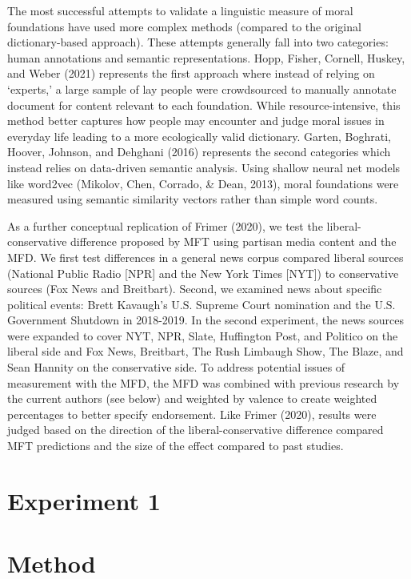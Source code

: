 \documentclass[
  english,
  man,floatsintext]{apa6}
\begin{document}
The most successful attempts to validate a linguistic measure of moral foundations have used more complex methods (compared to the original dictionary-based approach). These attempts generally fall into two categories: human annotations and semantic representations. Hopp, Fisher, Cornell, Huskey, and Weber (2021) represents the first approach where instead of relying on `experts,' a large sample of lay people were crowdsourced to manually annotate document for content relevant to each foundation. While resource-intensive, this method better captures how people may encounter and judge moral issues in everyday life leading to a more ecologically valid dictionary. Garten, Boghrati, Hoover, Johnson, and Dehghani (2016) represents the second categories which instead relies on data-driven semantic analysis. Using shallow neural net models like word2vec (Mikolov, Chen, Corrado, \& Dean, 2013), moral foundations were measured using semantic similarity vectors rather than simple word counts.

As a further conceptual replication of Frimer (2020), we test the liberal-conservative difference proposed by MFT using partisan media content and the MFD. We first test differences in a general news corpus compared liberal sources (National Public Radio {[}NPR{]} and the New York Times {[}NYT{]}) to conservative sources (Fox News and Breitbart). Second, we examined news about specific political events: Brett Kavaugh's U.S. Supreme Court nomination and the U.S. Government Shutdown in 2018-2019. In the second experiment, the news sources were expanded to cover NYT, NPR, Slate, Huffington Post, and Politico on the liberal side and Fox News, Breitbart, The Rush Limbaugh Show, The Blaze, and Sean Hannity on the conservative side. To address potential issues of measurement with the MFD, the MFD was combined with previous research by the current authors (see below) and weighted by valence to create weighted percentages to better specify endorsement. Like Frimer (2020), results were judged based on the direction of the liberal-conservative difference compared MFT predictions and the size of the effect compared to past studies.

\hypertarget{experiment-1}{%
\section{Experiment 1}\label{experiment-1}}

\hypertarget{method}{%
\section{Method}\label{method}}
\end{document}
